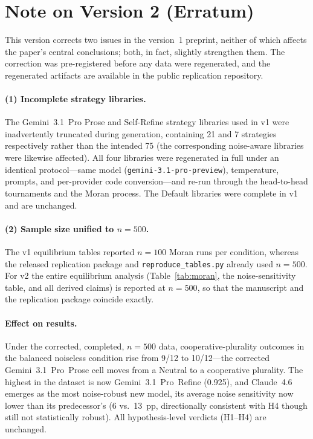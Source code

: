 \section*{Note on Version 2 (Erratum)}

This version corrects two issues in the version~1 preprint, neither of which
affects the paper's central conclusions; both, in fact, slightly strengthen
them. The correction was pre-registered before any data were regenerated, and
the regenerated artifacts are available in the public replication repository.

\paragraph{(1) Incomplete strategy libraries.}
The Gemini~3.1~Pro Prose and Self-Refine strategy libraries used in v1 were
inadvertently truncated during generation, containing 21 and 7 strategies
respectively rather than the intended 75 (the corresponding noise-aware
libraries were likewise affected). All four libraries were regenerated in
full under an identical protocol---same model (\texttt{gemini-3.1-pro-preview}),
temperature, prompts, and per-provider code conversion---and re-run through the
head-to-head tournaments and the Moran process. The Default libraries were
complete in v1 and are unchanged.

\paragraph{(2) Sample size unified to $n = 500$.}
The v1 equilibrium tables reported $n = 100$ Moran runs per condition, whereas
the released replication package and \texttt{reproduce\_tables.py} already used
$n = 500$. For v2 the entire equilibrium analysis (Table~\ref{tab:moran}, the
noise-sensitivity table, and all derived claims) is reported at $n = 500$, so
that the manuscript and the replication package coincide exactly.

\paragraph{Effect on results.}
Under the corrected, completed, $n = 500$ data, cooperative-plurality outcomes
in the balanced noiseless condition rise from 9/12 to 10/12---the corrected
Gemini~3.1~Pro~Prose cell moves from a Neutral to a cooperative plurality. The
highest \ICD in the dataset is now Gemini~3.1~Pro~Refine (0.925), and Claude~4.6
emerges as the most noise-robust new model, its average noise sensitivity now
lower than its predecessor's (6 vs.\ 13~pp, directionally consistent with H4
though still not statistically robust). All hypothesis-level verdicts
(H1--H4) are unchanged.
